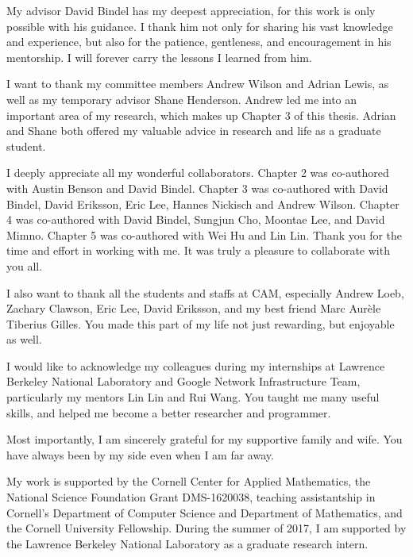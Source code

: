 My advisor David Bindel has my deepest appreciation, for this work is only
possible with his guidance. I thank him not only for sharing his vast knowledge
and experience, but also for the patience, gentleness, and encouragement in his
mentorship. I will forever carry the lessons I learned from him.

I want to thank my committee members Andrew Wilson and Adrian Lewis, as well as
my temporary advisor Shane Henderson. Andrew led me into an important area of my
research, which makes up Chapter 3 of this thesis. Adrian and Shane both offered
my valuable advice in research and life as a graduate student.

I deeply appreciate all my wonderful collaborators. Chapter 2 was co-authored
with Austin Benson and David Bindel. Chapter 3 was co-authored with David
Bindel, David Eriksson, Eric Lee, Hannes Nickisch and Andrew Wilson. Chapter 4
was co-authored with David Bindel, Sungjun Cho, Moontae Lee, and David Mimno.
Chapter 5 was co-authored with Wei Hu and Lin Lin. Thank you for the time and
effort in working with me. It was truly a pleasure to collaborate with you all.

I also want to thank all the students and staffs at CAM, especially  Andrew
Loeb, Zachary Clawson, Eric Lee, David Eriksson, and my best friend Marc Aur\`
{e}le Tiberius Gilles. You made this part of my life not just rewarding, but
enjoyable as well.

I would like to acknowledge my colleagues during my internships at Lawrence
Berkeley National Laboratory and Google Network Infrastructure Team,
particularly my mentors Lin Lin and Rui Wang. You taught me many useful skills,
and helped me become a better researcher and programmer.

Most importantly, I am sincerely grateful for my supportive family and wife. You
have always been by my side even when I am far away.

My work is supported by the Cornell Center for Applied Mathematics, the National
Science Foundation Grant DMS-1620038, teaching assistantship in Cornell's
Department of Computer Science and Department of Mathematics, and the Cornell
University Fellowship. During the summer of 2017, I am supported by the Lawrence
Berkeley National Laboratory as a graduate research intern.